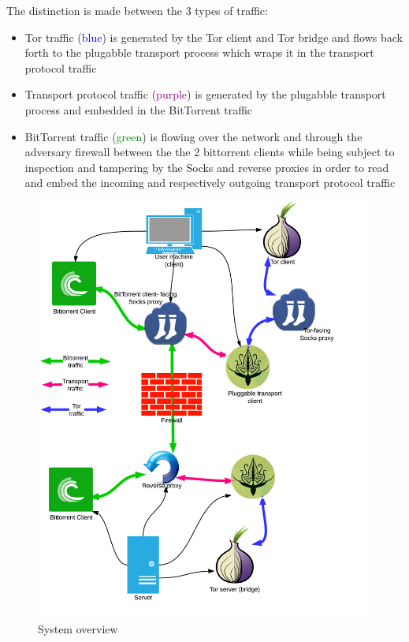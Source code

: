 \documentclass[11pt]{article} %
\begin{document}
The distinction is made between the 3 types of traffic:

\begin{itemize}
\item Tor traffic (\textcolor{blue}{blue}) is generated by the Tor client and Tor bridge and flows back forth to the plugabble transport process which wraps it in the transport protocol traffic 
\item Transport protocol traffic (\textcolor{purple}{purple}) is generated by the plugabble transport process and embedded in the BitTorrent traffic
\item  BitTorrent traffic (\textcolor{green}{green}) is flowing over the network and through the adversary firewall between the the 2 bittorrent clients while being subject to inspection and tampering by the Socks and reverse proxies in order to read and embed the incoming and respectively outgoing transport protocol traffic 
\end{itemize}

\begin{figure}[h!]
\begin{center}
\includegraphics[scale=0.23]{FuinSystemArchitecture}
\end{center}
 \caption{System overview}
 \label{fig:system_architecture}
 \end{figure}
\end{document}
